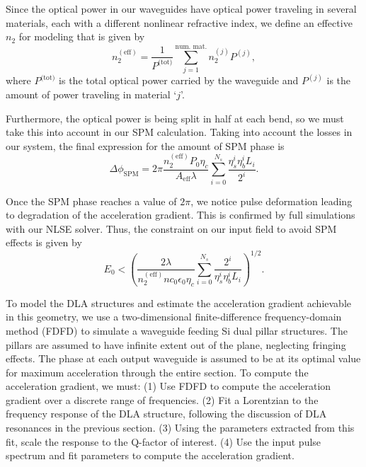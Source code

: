 Since the optical power in our waveguides have optical power traveling in several materials, each with a different nonlinear refractive index, we define an effective $n_2$ for modeling that is given by
\begin{equation}
n_2^{(\textrm{eff})} = \frac{1}{P^{\textrm{(tot)}}}\sum_{j=1}^{\textrm{num. mat.}} n_2^{(j)} P^{(j)},
\end{equation}
where $P^{\textrm{(tot)}}$ is the total optical power carried by the waveguide and $P^{(j)}$ is the amount of power traveling in material `$j$'.

Furthermore, the optical power is being split in half at each bend, so we must take this into account in our SPM calculation. Taking into account the losses in our system, the final expression for the amount of SPM phase is 
\begin{equation}
    \Delta\phi_{\textrm{SPM}} = 2\pi \frac{n_2^{(\textrm{eff})} P_0 \eta_c}{A_{\textrm{eff}}\lambda}\sum_{i=0}^{N_s}\frac{\eta_s^i\eta_b^i L_i}{2^i}.
\end{equation}

Once the SPM phase reaches a value of $2\pi$, we notice pulse deformation leading to degradation of the acceleration gradient. This is confirmed by full simulations with our NLSE solver. Thus, the constraint on our input field to avoid SPM effects is given by 
\begin{equation}
    E_0 < \left(\frac{2\lambda }{n_2^{(\textrm{eff})} n c_0 \epsilon_0 \eta_c}\sum_{i=0}^{N_s} \frac{2^i}{\eta_s^i\eta_b^i L_i} \right)^{1/2}.
\end{equation}

To model the DLA structures and estimate the acceleration gradient achievable in this geometry, we use a two-dimensional finite-difference frequency-domain method (FDFD) \cite{shin2012choice} to simulate a waveguide feeding Si dual pillar structures.  The pillars are assumed to have infinite extent out of the plane, neglecting fringing effects.  The phase at each output waveguide is assumed to be at its optimal value for maximum acceleration through the entire section.  To compute the acceleration gradient, we must: (1) Use FDFD to compute the acceleration gradient over a discrete range of frequencies. (2) Fit a Lorentzian to the frequency response of the DLA structure, following the discussion of DLA resonances in the previous section.  (3) Using the parameters extracted from this fit, scale the response to the Q-factor of interest.  (4) Use the input pulse spectrum and fit parameters to compute the acceleration gradient.

